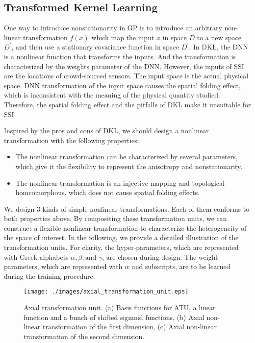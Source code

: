 \documentclass[journal, oneside, twocolumn]{IEEEtran}
\begin{document}
\subsection{Transformed Kernel Learning}
One way to introduce nonstationarity in GP is to introduce an arbitrary non-linear transformation $f(x)$ which map the input $x$ in space $D$ to a new space $D^\prime$, and then use a stationary covariance function in space $D^\prime$\cite{Rasmussen2006}. In DKL, the DNN is a nonlinear function that transforms the inputs. And the transformation is characterized by the weights parameter of the DNN. However, the inputs of SSI are the locations of crowd-sourced sensors. The input space is the actual physical space. DNN transformation of the input space causes the spatial folding effect, which is inconsistent with the meaning of the physical quantity studied. Therefore, the spatial folding effect and the pitfalls of DKL make it unsuitable for SSI.

Inspired by the pros and cons of DKL, we should design a nonlinear transformation with the following properties:
\begin{itemize}
  \item The nonlinear transformation can be characterized by several parameters, which give it the flexibility to represent the anisotropy and nonstationarity.
  \item The nonlinear transformation is an injective mapping and topological homeomorphous, which does not cause spatial folding effects.
\end{itemize} 

We design 3 kinds of simple nonlinear transformations. Each of them conforms to both properties above. By compositing these transformation units, we can construct a flexible nonlinear transformation to characterize the heterogeneity of the space of interest. In the following, we provide a detailed illustration of the transformation units. For clarity, the hyper-parameters, which are represented with Greek alphabets $\alpha, \beta, \text{and } \gamma$, are chosen during design. The weight parameters, which are represented with $w$ and subscripts, are to be learned during the training procedure.

\begin{figure}[!tb]
  \centering
  \texttt{[image: ./images/axial\_transformation\_unit.eps]}
  \caption{Axial transformation unit. (a) Basis functions for ATU, a linear function and a bunch of shifted sigmoid functions, (b) Axial non-linear transformation of the first dimension, (c) Axial non-linear transformation of the second dimension.}
  \label{fig:axial_trans_unit}
\end{figure}
\end{document}
